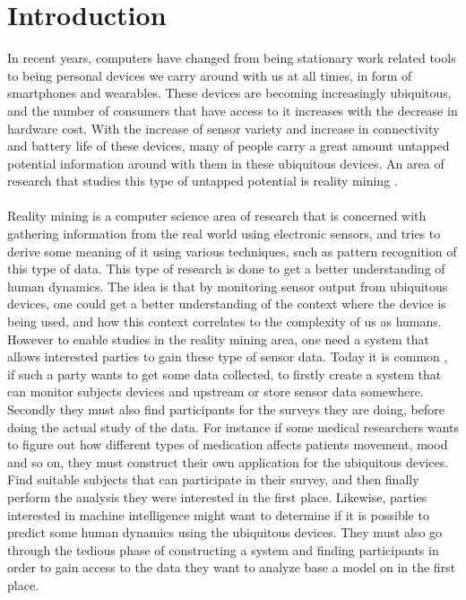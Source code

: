 \chapter{Introduction}
\label{cha:introduction}

In recent years, computers have changed from being stationary work related tools to being personal devices we carry around with us at all times, in form of smartphones and wearables. These devices are becoming increasingly ubiquitous, and the number of consumers that have access to it increases with the decrease in hardware cost. With the increase of sensor variety and increase in connectivity and battery life of these devices, many of people carry a great amount untapped potential information around with them in these ubiquitous devices.  An area of research that studies this type of untapped potential is reality mining .
\\\\
Reality mining is a computer science area of research that is concerned with gathering information from the real world using electronic sensors, and tries to derive some meaning of it using various techniques, such as pattern recognition of this type of data. This type of research is done to get a better understanding of human dynamics. The idea is that by monitoring sensor output from ubiquitous devices, one could get a better understanding of the context where the device is being used, and how this context correlates to the complexity of us as humans. However to enable studies in the reality mining area, one need a system that allows interested parties to gain these type of sensor data. Today it is common , if such a party wants to get some data collected, to firstly create a system that can monitor subjects devices and upstream or store sensor data somewhere. Secondly they must also find participants for the surveys they are doing, before doing the actual study of the data. For instance if some medical researchers wants to figure out how different types of medication affects patients movement, mood and so on, they must construct their own application for the ubiquitous devices. Find suitable subjects that can participate in their survey, and then finally perform the analysis they were interested in the first place. Likewise, parties interested in machine intelligence might want to determine if it is possible to predict some human dynamics using the ubiquitous devices. They must also go through the tedious phase of constructing a system and finding participants in order to gain access to the data they want to analyze base a model on in the first place.
